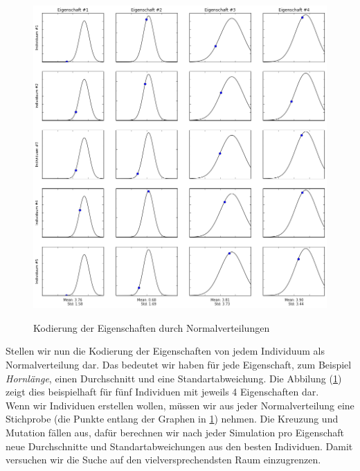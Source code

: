             \begin{figure}[H]
                    \begin{center}
                        \includegraphics[scale=0.47]{../pictures/diagrams/cross-entropy-visualization-ga.png}\\
                        \caption{Kodierung der Eigenschaften durch Normalverteilungen}\label{fig:norm-dist-encoding}
                    \end{center}
            \end{figure}

            Stellen wir nun die Kodierung der Eigenschaften von jedem Individuum als Normalverteilung dar. Das bedeutet wir haben für jede Eigenschaft, zum Beispiel \textit{Hornlänge}, einen Durchschnitt und eine Standartabweichung. Die Abbilung (\ref{fig:norm-dist-encoding}) zeigt dies beispielhaft für fünf Individuen mit jeweils 4 Eigenschaften dar.\\[3mm]
            \noindent
            Wenn wir Individuen erstellen wollen, müssen wir aus jeder Normalverteilung eine Stichprobe (die Punkte entlang der Graphen in \ref{fig:norm-dist-encoding}) nehmen. Die Kreuzung und Mutation fällen aus, dafür berechnen wir nach jeder Simulation pro Eigenschaft neue Durchschnitte und Standartabweichungen aus den besten Individuen. Damit versuchen wir die Suche auf den vielversprechendsten Raum einzugrenzen.
